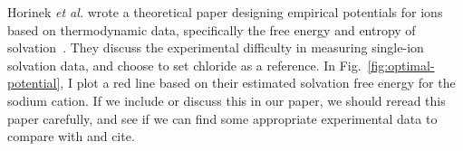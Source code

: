 \documentclass[twocolumn]{revtex4-1}
\begin{document}
Horinek \emph{et al.} wrote a theoretical paper designing empirical
potentials for ions based on thermodynamic data, specifically the free
energy and entropy of solvation~\cite{horinek2009rational}.  They
discuss the experimental difficulty in measuring single-ion solvation
data, and choose to set chloride as a reference.  In
Fig.~\ref{fig:optimal-potential}, I plot a red line based on their
estimated solvation free energy for the sodium cation.  If we include
or discuss this in our paper, we should reread this paper carefully,
and see if we can find some appropriate experimental data to compare
with and cite.



\end{document}

